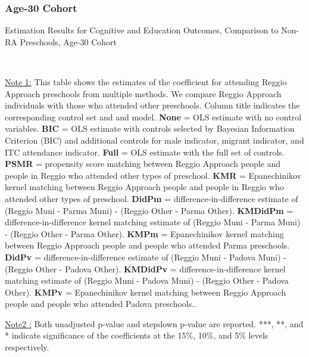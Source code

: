 \subsubsection{Age-30 Cohort}
\begin{table}[H] \caption{Estimation Results for Cognitive and Education Outcomes, Comparison to Non-RA Preschools, Age-30 Cohort} \label{ols-CN-adult30-reg-other}
\scalebox{0.6}{}
\vspace{1ex} \\
\footnotesize\raggedright{\underline{Note 1:} This table shows the estimates of the coefficient for attending Reggio Approach preschools from multiple methods. We compare Reggio Approach individuals with those who attended other preschools. Column title indicates the corresponding control set and and model. \textbf{None} = OLS estimate with no control variables. \textbf{BIC} = OLS estimate with controls selected by Bayesian Information Criterion (BIC) and additional controls for male indicator, migrant indicator, and ITC attendance indicator. \textbf{Full} = OLS estimate with the full set of controls. \textbf{PSMR} =  propensity score matching between Reggio Approach people and people in Reggio who attended other types of preschool. \textbf{KMR} = Epanechinikov kernel matching between Reggio Approach people and people in Reggio who attended other types of preschool. \textbf{DidPm} = difference-in-difference estimate of (Reggio Muni - Parma Muni) - (Reggio Other - Parma Other). \textbf{KMDidPm} = difference-in-difference kernel matching estimate of (Reggio Muni - Parma Muni) - (Reggio Other - Parma Other).   \textbf{KMPm} = Epanechinikov kernel matching between Reggio Approach people and people who attended Parma preschools. \textbf{DidPv} = difference-in-difference estimate of (Reggio Muni - Padova Muni) - (Reggio Other - Padova Other). \textbf{KMDidPv} = difference-in-difference kernel matching estimate of (Reggio Muni - Padova Muni) - (Reggio Other - Padova Other).  \textbf{KMPv} = Epanechinikov kernel matching between Reggio Approach people and people who attended Padova preschools..}

\footnotesize\raggedright{\underline{Note2 :} Both unadjusted p-value and stepdown p-value are reported. ***, **, and * indicate significance of the coefficients at the 15\%, 10\%, and 5\% levels respectively.}
\end{table}

